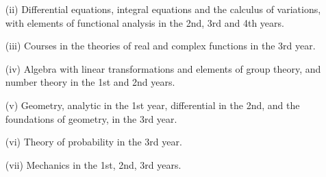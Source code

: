 \begin{enumerate}
\begin{itemize}
\item[(ii)] Differential equations, integral equations and the calculus of variations, with elements of functional analysis in the 2nd, 3rd and 4th years.

\item[(iii)] Courses in the theories of real and complex functions in the 3rd year.

\item[(iv)] Algebra with linear transformations and elements of group theory, and number theory in the 1st and 2nd years.

\item[(v)] Geometry, analytic in the 1st year, differential in the 2nd, and the foundations of geometry, in the 3rd year.

\item[(vi)] Theory of probability in the 3rd year.

\item[(vii)] Mechanics in the 1st, 2nd, 3rd years.
\end{itemize}
\end{enumerate}

